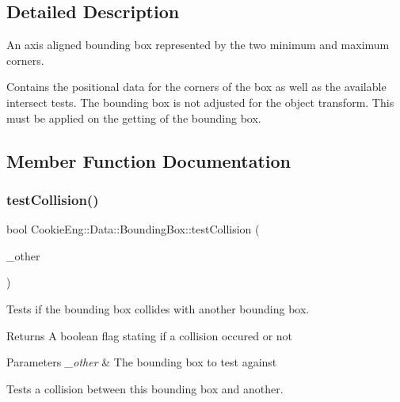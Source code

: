 \subsection{Detailed Description}
An axis aligned bounding box represented by the two minimum and maximum corners. 

Contains the positional data for the corners of the box as well as the available intersect tests. The bounding box is not adjusted for the object transform. This must be applied on the getting of the bounding box. 

\subsection{Member Function Documentation}
\mbox{\label{class_cookie_eng_1_1_data_1_1_bounding_box_a94539a8dd3721908761cd412b1118a89}} 
\subsubsection{\texorpdfstring{test\+Collision()}{testCollision()}\hspace{0.1cm}{\footnotesize\ttfamily [1/2]}}
{\footnotesize\ttfamily bool Cookie\+Eng\+::\+Data\+::\+Bounding\+Box\+::test\+Collision (\begin{DoxyParamCaption}\item[{const \hyperlink{class_cookie_eng_1_1_data_1_1_bounding_box}{Bounding\+Box} \&}]{\+\_\+other }\end{DoxyParamCaption})\hspace{0.3cm}{\ttfamily [inline]}}



Tests if the bounding box collides with another bounding box. 

\begin{DoxyReturn}{Returns}
A boolean flag stating if a collision occured or not 
\end{DoxyReturn}

\begin{DoxyParams}{Parameters}
{\em \+\_\+other} & The bounding box to test against\\
\hline
\end{DoxyParams}
Tests a collision between \textquotesingle{}this\textquotesingle{} bounding box and another. \mbox{\label{class_cookie_eng_1_1_data_1_1_bounding_box_aca6e208bb82b3842ac475bbc25c0ff0a}} 
